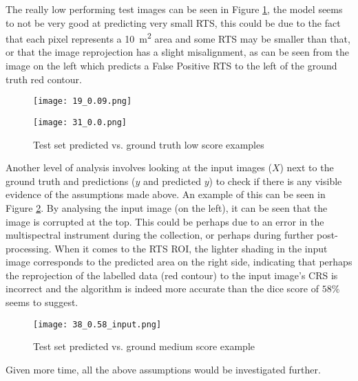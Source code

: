 The really low performing test images can be seen in Figure \ref{low_score_pic}, the model seems to not be very good at predicting very small \gls{RTS}, this could be due to the fact that each pixel represents a \SI{10}{\metre\squared} area and some \gls{RTS} may be smaller than that, or that the image reprojection has a slight misalignment, as can be seen from the image on the left which predicts a False Positive \gls{RTS} to the left of the ground truth red contour.

    \begin{figure}[hbt!]
        \begin{minipage}[c]{0.55\linewidth}
        \texttt{[image: 19\_0.09.png]}
        \label{best_dice}
        \end{minipage}
            \hfill
            \begin{minipage}[c]{0.55\linewidth}
            \texttt{[image: 31\_0.0.png]}
            \label{low_score_pic}
        \end{minipage}
        \caption{Test set predicted vs. ground truth low score examples}
    \end{figure}

Another level of analysis involves looking at the input images ($X$) next to the ground truth and predictions ($y$ and predicted $y$) to check if there is any visible evidence of the assumptions made above. An example of this can be seen in Figure \ref{medium_score_input_pic}. By analysing the input image (on the left), it can be seen that the image is corrupted at the top. This could be perhaps due to an error in the multispectral instrument during the collection, or perhaps during further post-processing. When it comes to the \gls{RTS} \gls{ROI}, the lighter shading in the input image corresponds to the predicted area on the right side, indicating that perhaps the reprojection of the labelled data (red contour) to the input image's \gls{CRS} is incorrect and the algorithm is indeed more accurate than the dice score of $58\%$ seems to suggest.
    \begin{figure}[hbt!]
        \centering
        \texttt{[image: 38\_0.58\_input.png]}
        \caption{Test set predicted vs. ground medium score example}
        \label{medium_score_input_pic}
    \end{figure}

Given more time, all the above assumptions would be investigated further.